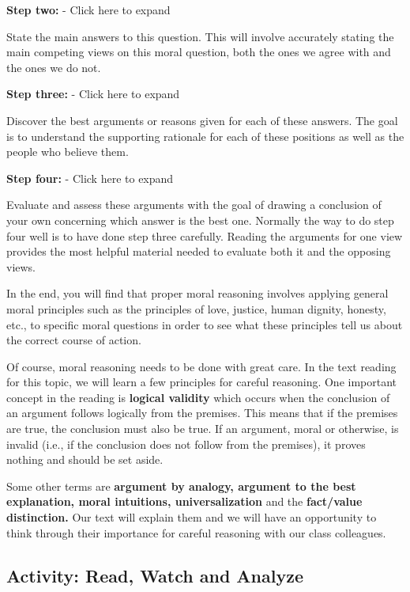 \documentclass[
]{book}
\begin{document}
\textbf{Step two:} - Click here to expand

State the main answers to this question. This will involve accurately stating the main competing views on this moral question, both the ones we agree with and the ones we do not.

\textbf{Step three:} - Click here to expand

Discover the best arguments or reasons given for each of these answers. The goal is to understand the supporting rationale for each of these positions as well as the people who believe them.

\textbf{Step four:} - Click here to expand

Evaluate and assess these arguments with the goal of drawing a conclusion of your own concerning which answer is the best one. Normally the way to do step four well is to have done step three carefully. Reading the arguments for one view provides the most helpful material needed to evaluate both it and the opposing views.

In the end, you will find that proper moral reasoning involves applying general moral principles such as the principles of love, justice, human dignity, honesty, etc., to specific moral questions in order to see what these principles tell us about the correct course of action.

Of course, moral reasoning needs to be done with great care. In the text reading for this topic, we will learn a few principles for careful reasoning. One important concept in the reading is \textbf{logical validity} which occurs when the conclusion of an argument follows logically from the premises. This means that if the premises are true, the conclusion must also be true. If an argument, moral or otherwise, is invalid (i.e., if the conclusion does not follow from the premises), it proves nothing and should be set aside.

Some other terms are \textbf{argument by analogy, argument to the best explanation, moral intuitions, universalization} and the \textbf{fact/value distinction.} Our text will explain them and we will have an opportunity to think through their importance for careful reasoning with our class colleagues.

\hypertarget{activity-read-watch-and-analyze}{%
\subsection*{Activity: Read, Watch and Analyze}\label{activity-read-watch-and-analyze}}
\end{document}
